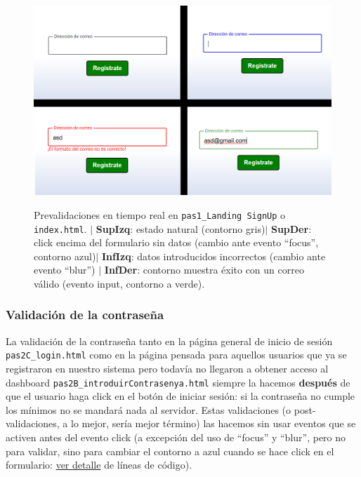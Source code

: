 \documentclass[a4paper,12pt]{report}
\begin{document}
	
	
		
		
		\FloatBarrier
		\setlength{\belowcaptionskip}{3pt}
		\begin{figure}[H]
			\centering
			\caption{Prevalidaciones en tiempo real en \texttt{pas1\_Landing SignUp} o \texttt{index.html}. $|$ \textbf{SupIzq}: estado natural (contorno gris)$|$ \textbf{SupDer}: click encima del formulario sin datos (cambio ante evento ``focus'', contorno azul)$|$ \textbf{InfIzq}: datos introducidos incorrectos (cambio ante evento ``blur'') $|$ \textbf{InfDer}: contorno muestra éxito con un correo válido (evento input, contorno a verde).}
			\includegraphics[width=.9\linewidth]{img/logicaInputBlurSignup}
			\label{fig:logicaInputBlurSignup}
		\end{figure}
		\FloatBarrier
		
		
		\subsubsection{Validación de la contraseña}
		
		La validación de la contraseña tanto en la página general de inicio de sesión \texttt{pas2C\_login.html} como en la página pensada para aquellos usuarios que ya se registraron en nuestro sistema pero todavía no llegaron a obtener acceso al dashboard  \texttt{pas2B\_introduirContrasenya.html} siempre la hacemos \textbf{después} de que el usuario haga click en el botón de iniciar sesión: si la contraseña no cumple los mínimos no se mandará nada al servidor. Estas validaciones (o post-validaciones, a lo mejor, sería mejor término) las hacemos sin usar eventos que se activen antes del evento click (a excepción del uso de ``focus'' y ``blur'', pero no para validar, sino para cambiar el contorno a azul cuando se hace click en el formulario: \href{https://github.com/blackcub3s/mercApp/blob/dc4941c33c65fb9133f4aa8ca890059243bf080d/APP%20WEB/__frontend__produccio__/app/js/inputContra.js#L45-L83}{ver detalle} de líneas de código).
		
\end{document}

